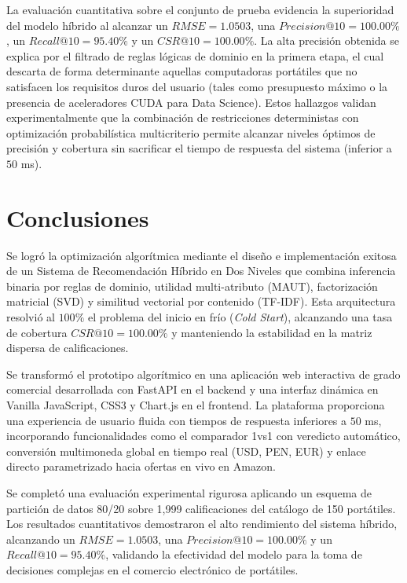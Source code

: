 \documentclass[12pt,a4paper]{article}
\begin{document}
La evaluación cuantitativa sobre el conjunto de prueba evidencia la superioridad del modelo híbrido al alcanzar un $RMSE = 1.0503$, una $Precision@10 = 100.00\%$, un $Recall@10 = 95.40\%$ y un $CSR@10 = 100.00\%$. La alta precisión obtenida se explica por el filtrado de reglas lógicas de dominio en la primera etapa, el cual descarta de forma determinante aquellas computadoras portátiles que no satisfacen los requisitos duros del usuario (tales como presupuesto máximo o la presencia de aceleradores CUDA para Data Science). Estos hallazgos validan experimentalmente que la combinación de restricciones deterministas con optimización probabilística multicriterio permite alcanzar niveles óptimos de precisión y cobertura sin sacrificar el tiempo de respuesta del sistema (inferior a $50$ ms).

\section{Conclusiones}

Se logró la optimización algorítmica mediante el diseño e implementación exitosa de un Sistema de Recomendación Híbrido en Dos Niveles que combina inferencia binaria por reglas de dominio, utilidad multi-atributo (MAUT), factorización matricial (SVD) y similitud vectorial por contenido (TF-IDF). Esta arquitectura resolvió al $100\%$ el problema del inicio en frío (\textit{Cold Start}), alcanzando una tasa de cobertura $CSR@10 = 100.00\%$ y manteniendo la estabilidad en la matriz dispersa de calificaciones.

Se transformó el prototipo algorítmico en una aplicación web interactiva de grado comercial desarrollada con FastAPI en el backend y una interfaz dinámica en Vanilla JavaScript, CSS3 y Chart.js en el frontend. La plataforma proporciona una experiencia de usuario fluida con tiempos de respuesta inferiores a $50$ ms, incorporando funcionalidades como el comparador 1vs1 con veredicto automático, conversión multimoneda global en tiempo real (USD, PEN, EUR) y enlace directo parametrizado hacia ofertas en vivo en Amazon.

Se completó una evaluación experimental rigurosa aplicando un esquema de partición de datos 80/20 sobre 1,999 calificaciones del catálogo de 150 portátiles. Los resultados cuantitativos demostraron el alto rendimiento del sistema híbrido, alcanzando un $RMSE = 1.0503$, una $Precision@10 = 100.00\%$ y un $Recall@10 = 95.40\%$, validando la efectividad del modelo para la toma de decisiones complejas en el comercio electrónico de portátiles.
\end{document}
